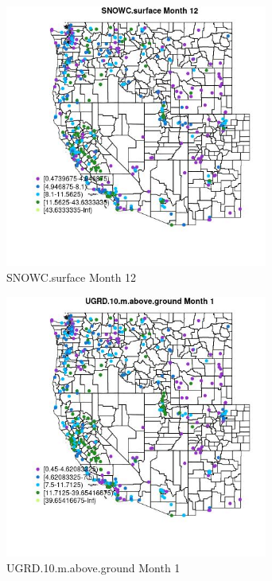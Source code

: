 \begin{figure} 
\centering  
\includegraphics[width=0.77\textwidth]{Code_Outputs/ML_input_report_ML_input_PM25_Step5_part_d_de_duplicated_aves_ML_input_MapObsMo12SNOWCsurface.jpg} 
\caption{\label{fig:ML_input_report_ML_input_PM25_Step5_part_d_de_duplicated_aves_ML_inputMapObsMo12SNOWCsurface}SNOWC.surface Month 12} 
\end{figure} 
 

\begin{figure} 
\centering  
\includegraphics[width=0.77\textwidth]{Code_Outputs/ML_input_report_ML_input_PM25_Step5_part_d_de_duplicated_aves_ML_input_MapObsMo1UGRD10maboveground.jpg} 
\caption{\label{fig:ML_input_report_ML_input_PM25_Step5_part_d_de_duplicated_aves_ML_inputMapObsMo1UGRD10maboveground}UGRD.10.m.above.ground Month 1} 
\end{figure} 
 

